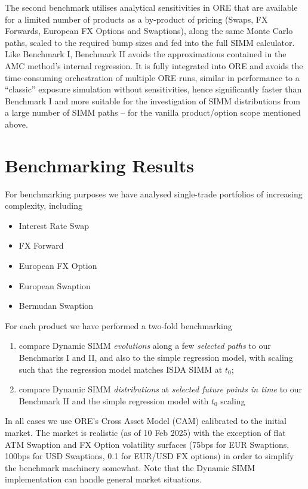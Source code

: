 \documentclass[11pt,a4paper,oneside]{article}
\begin{document}
The second benchmark utilises analytical sensitivities in ORE that are
available for a limited number of products as a by-product of pricing (Swaps, FX Forwards, European FX Options and Swaptions),
along the same Monte Carlo paths, scaled to the required bump sizes and fed into the full SIMM calculator.
Like Benchmark I, Benchmark II avoids the approximations contained in the AMC method's internal regression. 
It is fully integrated into ORE and avoids the time-consuming orchestration of multiple ORE runs, similar in performance to
a ``classic'' exposure simulation without sensitivities, hence significantly faster than Benchmark I and more suitable for the
investigation of SIMM distributions from a large number of SIMM paths -- for the vanilla product/option scope mentioned above.

\section{Benchmarking Results} \label{sec:benchmarking}

For benchmarking purposes we have analysed single-trade portfolios of increasing complexity, including
\begin{itemize}
\item Interest Rate Swap
\item FX Forward
\item European FX Option
\item European Swaption
\item Bermudan Swaption
\end{itemize}
For each product we have performed a two-fold benchmarking
\begin{enumerate}
\item compare Dynamic SIMM {\em evolutions} along a few {\em selected paths} to our Benchmarks I and II, and also
  to the  simple regression model, with scaling such that the regression model matches ISDA SIMM at $t_0$;
\item compare Dynamic SIMM {\em distributions} at {\em selected future points in time} to our Benchmark II and
  the simple regression model with $t_0$ scaling
\end{enumerate}

In all cases we use ORE's Cross Asset Model (CAM) calibrated to the initial market. The market is realistic
(as of 10 Feb 2025) with the exception of flat ATM Swaption and FX Option volatility surfaces (75bps for EUR
Swaptions, 100bps for USD Swaptions, 0.1 for EUR/USD FX options) in order to simplify the benchmark machinery somewhat.
Note that the Dynamic SIMM implementation can handle general market situations.
\end{document}
